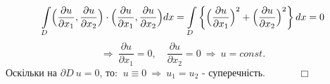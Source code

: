 \documentclass[a4 paper,12pt,ukrainian]{report}
\begin{document}
\begin{equation*}
\int\limits_{D}\Bigl(\frac{\partial u}{\partial x_1},\frac{\partial u}{\partial x_2}\Bigr)\cdot\Bigl(\frac{\partial u}{\partial x_1},\frac{\partial u}{\partial x_2}\Bigr)dx=\int\limits_{D}\left\{\Bigl(\frac{\partial u}{\partial x_1}\Bigr)^2+\Bigl(\frac{\partial u}{\partial x_2}\Bigr)^2\right\}dx=0
\end{equation*}
\begin{equation*}
\Rightarrow \ \frac{\partial u}{\partial x_1}=0, \quad \frac{\partial u}{\partial x_2}=0 \ \Rightarrow \ u=const.
\end{equation*}
Оскільки на $\partial D \ u=0$, то: $ \ u\equiv 0 \ \Rightarrow \ u_1=u_2$ - суперечність. $\quad\quad\quad\Box$ 
\newpage



\end{document}
